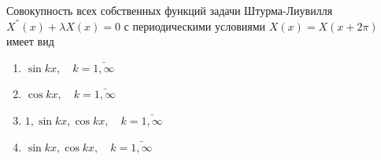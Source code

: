 Совокупность всех собственных функций задачи Штурма-Лиувилля \(X^{''}\left(x\right)+\lambda X\left(x\right)=0\) с периодическими условиями \(X\left(x\right)=X(x+2\pi )\) имеет вид

\begin{enumerate}[label=\arabic*)]
    \item \(\sin kx,\quad k=\bar{1,\infty }\)
    \item \(\cos kx,\quad k=\bar{1,\infty }\)
    \item \(1,\sin kx,\cos kx,\quad k=\bar{1,\infty }\)
    \item \(\sin kx,\cos kx,\quad k=\bar{1,\infty }\)
\end{enumerate}

